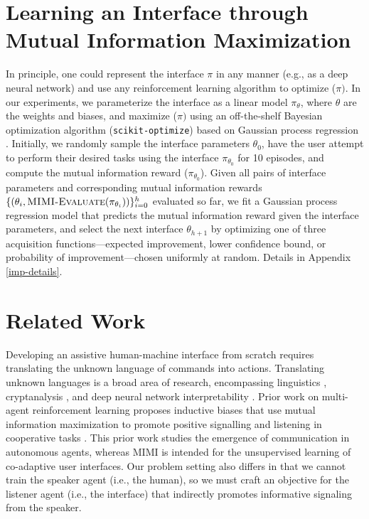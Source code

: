 \documentclass{article}
\begin{document}
\section{Learning an Interface through Mutual Information Maximization} \label{int-opt}

In principle, one could represent the interface $\pi$ in any manner (e.g., as a deep neural network) and use any reinforcement learning algorithm to optimize ($\pi)$.
In our experiments, we parameterize the interface as a linear model $\pi_{\theta}$, where $\theta$ are the weights and biases, and maximize ($\pi)$ using an off-the-shelf Bayesian optimization algorithm (\verb+scikit-optimize+) \cite{scikit-learn} based on Gaussian process regression \cite{gaussianproc}.
Initially, we randomly sample the interface parameters $\theta_0$, have the user attempt to perform their desired tasks using the interface $\pi_{\theta_0}$ for 10 episodes, and compute the mutual information reward ($\pi_{\theta_0}$). 
Given all pairs of interface parameters and corresponding mutual information rewards $\{(\theta_i, \textproc{MIMI-Evaluate}(\pi_{\theta_i}))\}_{i=0}^h$ evaluated so far, we fit a Gaussian process regression model that predicts the mutual information reward given the interface parameters, and select the next interface $\theta_{h+1}$ by optimizing one of three acquisition functions---expected improvement, lower confidence bound, or probability of improvement---chosen uniformly at random. 
Details in Appendix \ref{imp-details}.

\section{Related Work} \label{rel-work}

Developing an assistive human-machine interface from scratch requires translating the unknown language of commands into actions.
Translating unknown languages is a broad area of research, encompassing linguistics \cite{chadwick1967decipherment}, cryptanalysis \cite{sinkov2009elementary}, and deep neural network interpretability \cite{andreas2017translating,olah2018building,cammarata2020thread}.
Prior work on multi-agent reinforcement learning proposes inductive biases that use mutual information maximization to promote positive signalling and listening in cooperative tasks \cite{eccles2019biases,jaques2019social}.
This prior work studies the emergence of communication in autonomous agents, whereas MIMI is intended for the unsupervised learning of co-adaptive user interfaces.
Our problem setting also differs in that we cannot train the speaker agent (i.e., the human), so we must craft an objective for the listener agent (i.e., the interface) that indirectly promotes informative signaling from the speaker.
\end{document}
